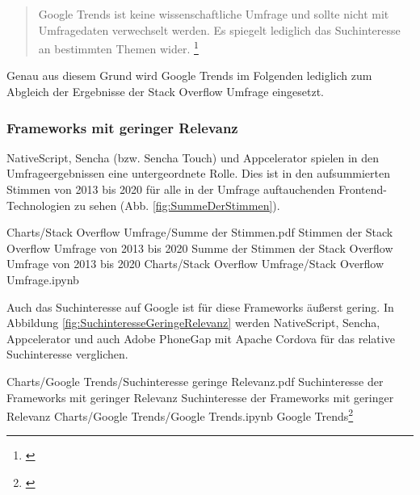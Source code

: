 \begin{quotation}
Google Trends ist keine wissenschaftliche Umfrage und sollte nicht mit Umfragedaten verwechselt werden. Es spiegelt lediglich das Suchinteresse an bestimmten Themen wider. \footnote{\cite{GoogleTrendsHilfe}}
\end{quotation}

Genau aus diesem Grund wird Google Trends im Folgenden lediglich zum Abgleich der Ergebnisse der Stack Overflow Umfrage eingesetzt. 

\subsubsection{Frameworks mit geringer Relevanz}

NativeScript, Sencha (bzw. Sencha Touch) und Appcelerator spielen in den Umfrageergebnissen eine untergeordnete Rolle. Dies ist in den aufsummierten Stimmen von 2013 bis 2020 für alle in der Umfrage auftauchenden Frontend-Technologien zu sehen (Abb. \ref{fig:SummeDerStimmen}).

\begin{alexfigurewithnotebook}{Charts/Stack Overflow Umfrage/Summe der Stimmen.pdf}
	{Stimmen der Stack Overflow Umfrage von 2013 bis 2020}
	{Summe der Stimmen der Stack Overflow Umfrage von 2013 bis 2020}
	{Charts/Stack Overflow Umfrage/Stack Overflow Umfrage.ipynb}
	{}

	\label{lst:Schritt1MassnahmenDeserialisierenOhneFehlerUnitTest}

\end{alexfigurewithnotebook}

Auch das Suchinteresse auf Google ist für diese Frameworks äußerst gering. In Abbildung \ref{fig:SuchinteresseGeringeRelevanz} werden NativeScript, Sencha, Appcelerator und auch Adobe PhoneGap mit Apache Cordova für das relative Suchinteresse verglichen.

\begin{alexfigurewithnotebook}{Charts/Google Trends/Suchinteresse geringe Relevanz.pdf}
	{Suchinteresse der Frameworks mit geringer Relevanz}
	{Suchinteresse der Frameworks mit geringer Relevanz}
	{Charts/Google Trends/Google Trends.ipynb}
	{Google Trends\footnote{\cite{FaqPhoneGapDocs}}}
	\label{fig:SuchinteresseGeringeRelevanz}

\end{alexfigurewithnotebook}

